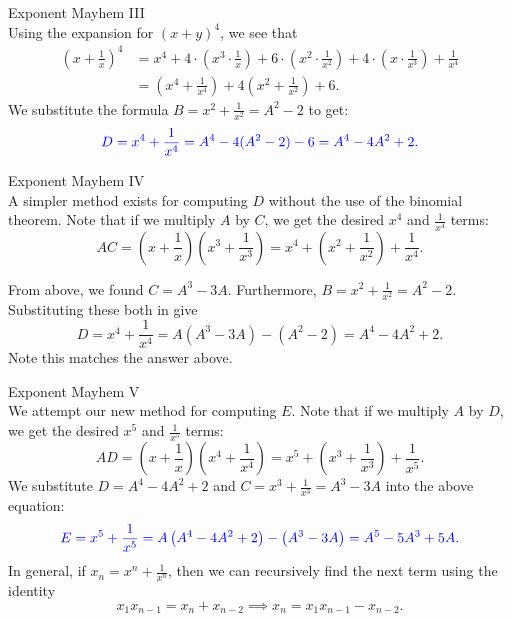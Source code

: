 \documentclass[xcolor=dvipsnames, fontsize=11pt, %
pagesize, %
parskip=half-, t]{beamer}
\begin{document}
\begin{frame}{Exponent Mayhem III}
	 ~\\
	
	Using the expansion for $(x+y)^4$, we see that \begin{align*} (x+\frac{1}{x})^4&=x^4+4\cdot \left(x^3\cdot \frac{1}{x}\right)+6\cdot \left(x^2\cdot \frac{1}{x^2}\right)+4\cdot \left(x\cdot \frac{1}{x^3}\right)+\frac{1}{x^4} \\ &= \left(x^4+\frac{1}{x^4}\right)+4\left(x^2+\frac{1}{x^2}\right)+6. \end{align*}
	We substitute the formula $B=x^2+\frac{1}{x^2}=A^2-2$ to get: $$\color{blue} D=x^4+\frac{1}{x^4}=A^4-4(A^2-2)-6=A^4-4A^2+2.$$ 
	
\end{frame}

\begin{frame}{Exponent Mayhem IV}
		 ~\\
		
	A simpler method exists for computing $D$ without the use of the binomial theorem. Note that if we multiply $A$ by $C$, we get the desired $x^4$ and $\frac{1}{x^4}$ terms: $$AC=\left(x+\frac{1}{x}\right)\left(x^3+\frac{1}{x^3}\right)=x^4+\left(x^2+\frac{1}{x^2}\right)+\frac{1}{x^4}.$$  
	
	From above, we found $C=A^3-3A$. Furthermore, $B=x^2+\frac{1}{x^2}=A^2-2$. Substituting these both in give $$D=x^4+\frac{1}{x^4}=A(A^3-3A)-(A^2-2)=A^4-4A^2+2.$$ Note this matches the answer above.  
	
\end{frame}

\begin{frame}{Exponent Mayhem V}
	 ~\\	
	We attempt our new method for computing $E$. Note that if we multiply $A$ by $D$, we get the desired $x^5$ and $\frac{1}{x^5}$ terms: $$AD=\left(x+\frac{1}{x}\right)\left(x^4+\frac{1}{x^4}\right)=x^5+\left(x^3+\frac{1}{x^3}\right)+\frac{1}{x^5}.$$  
	We substitute $D=A^4-4A^2+2$ and $C=x^3+\frac{1}{x^3}=A^3-3A$ into the above equation: $$\color{blue} E=x^5+\frac{1}{x^5}=A\left(A^4-4A^2+2\right)-\left(A^3-3A\right)=A^5-5A^3+5A.$$In general, if $x_n=x^n+\frac{1}{x^n}$, then we can recursively find the next term using the identity $$x_1x_{n-1}=x_n+x_{n-2}\implies x_n=x_1x_{n-1}-x_{n-2}.$$ 
\end{frame}
\end{document}
